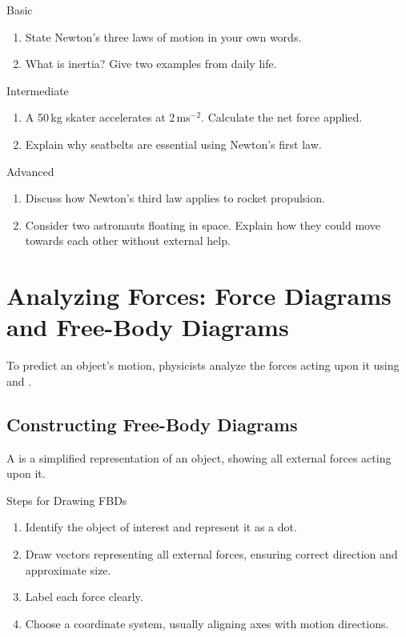 \FloatBarrier

\begin{tieredquestions}{Basic}
\begin{enumerate}
    \item State Newton’s three laws of motion in your own words.
    \item What is inertia? Give two examples from daily life.
\end{enumerate}
\end{tieredquestions}

\begin{tieredquestions}{Intermediate}
\begin{enumerate}
    \item A 50\,kg skater accelerates at 2\,ms$^{-2}$. Calculate the net force applied.
    \item Explain why seatbelts are essential using Newton's first law.
\end{enumerate}
\end{tieredquestions}

\begin{tieredquestions}{Advanced}
\begin{enumerate}
    \item Discuss how Newton’s third law applies to rocket propulsion.
    \item Consider two astronauts floating in space. Explain how they could move towards each other without external help.
\end{enumerate}
\end{tieredquestions}

\section{Analyzing Forces: Force Diagrams and Free-Body Diagrams}
\FloatBarrier

To predict an object's motion, physicists analyze the forces acting upon it using  and .

\subsection{Constructing Free-Body Diagrams}
\FloatBarrier

A  is a simplified representation of an object, showing all external forces acting upon it.

\begin{keyconcept}{Steps for Drawing FBDs}
\begin{enumerate}
    \item Identify the object of interest and represent it as a dot.
    \item Draw vectors representing all external forces, ensuring correct direction and approximate size.
    \item Label each force clearly.
    \item Choose a coordinate system, usually aligning axes with motion directions.
\end{enumerate}
\end{keyconcept}

